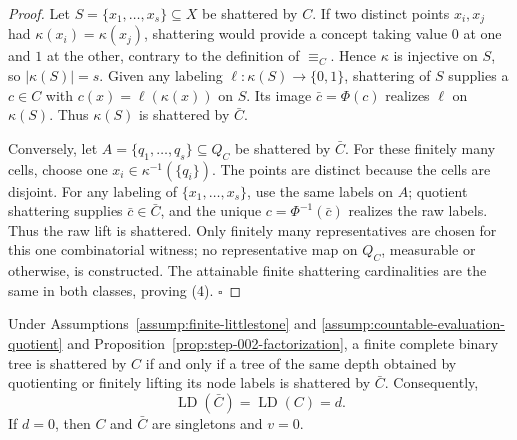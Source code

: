 \begin{proof}
Let \(S=\{x_1,\ldots,x_s\}\subseteq X\) be shattered by \(C\). If
two distinct points \(x_i,x_j\) had \(\kappa(x_i)=\kappa(x_j)\), shattering
would provide a concept taking value \(0\) at one and \(1\) at the other,
contrary to the definition of \(\equiv_C\). Hence \(\kappa\) is injective on
\(S\), so \(|\kappa(S)|=s\). Given any labeling
\(\ell:\kappa(S)\to\{0,1\}\), shattering of \(S\) supplies a \(c\in C\)
with \(c(x)=\ell(\kappa(x))\) on \(S\). Its image \(\bar c=\Phi(c)\) realizes
\(\ell\) on \(\kappa(S)\). Thus \(\kappa(S)\) is shattered by \(\bar C\).

Conversely, let \(A=\{q_1,\ldots,q_s\}\subseteq Q_C\) be shattered by
\(\bar C\). For these finitely many cells, choose one
\(x_i\in\kappa^{-1}(\{q_i\})\). The points are distinct because the cells are
disjoint. For any labeling of \(\{x_1,\ldots,x_s\}\), use the same labels on
\(A\); quotient shattering supplies \(\bar c\in\bar C\), and the unique
\(c=\Phi^{-1}(\bar c)\) realizes the raw labels. Thus the raw lift is
shattered. Only finitely many representatives are chosen for this one
combinatorial witness; no representative map on \(Q_C\), measurable or
otherwise, is constructed. The attainable finite shattering cardinalities
are the same in both classes, proving (4). \(\square\)


\end{proof}

\begin{lemma}\label{lem:step-002-ld}
Under Assumptions~\ref{assump:finite-littlestone} and
\ref{assump:countable-evaluation-quotient} and
Proposition~\ref{prop:step-002-factorization}, a finite complete binary tree
is shattered by \(C\) if and only if a tree of the same depth obtained by
quotienting or finitely lifting its node labels is shattered by \(\bar C\).
Consequently,
\[
\operatorname{LD}(\bar C)=\operatorname{LD}(C)=d.
\tag{5}
\]
If \(d=0\), then \(C\) and \(\bar C\) are singletons and \(v=0\).


\end{lemma}


